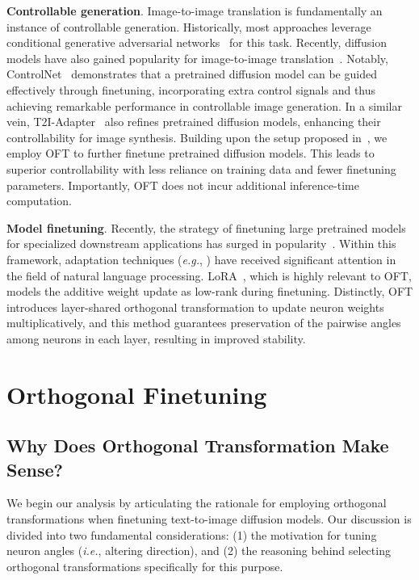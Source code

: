 \textbf{Controllable generation}. Image-to-image translation is fundamentally an instance of controllable generation. Historically, most approaches leverage conditional generative adversarial networks~\cite{isola2017image,zhu2017toward,wang2018high,park2019semantic,choi2018stargan} for this task. Recently, diffusion models have also gained popularity for image-to-image translation~\cite{saharia2022palette,voynov2022sketch,wang2022pretraining}. Notably, ControlNet~\cite{zhang2023adding} demonstrates that a pretrained diffusion model can be guided effectively through finetuning, incorporating extra control signals and thus achieving remarkable performance in controllable image generation. In a similar vein, T2I-Adapter~\cite{mou2023t2i} also refines pretrained diffusion models, enhancing their controllability for image synthesis. Building upon the setup proposed in~\cite{zhang2023adding,mou2023t2i}, we employ OFT to further finetune pretrained diffusion models. This leads to superior controllability with less reliance on training data and fewer finetuning parameters. Importantly, OFT does not incur additional inference-time computation.

\textbf{Model finetuning}. Recently, the strategy of finetuning large pretrained models for specialized downstream applications has surged in popularity~\cite{devlin2018bert,brown2020language,he2022masked}. Within this framework, adaptation techniques (\emph{e.g.}, \cite{hulora2022,houlsby2019parameter,pfeiffer2020adapterfusion}) have received significant attention in the field of natural language processing. LoRA~\cite{hulora2022}, which is highly relevant to OFT, models the additive weight update as low-rank during finetuning. Distinctly, OFT introduces layer-shared orthogonal transformation to update neuron weights multiplicatively, and this method guarantees preservation of the pairwise angles among neurons in each layer, resulting in improved stability.

\section{Orthogonal Finetuning}

\subsection{Why Does Orthogonal Transformation Make Sense?}

We begin our analysis by articulating the rationale for employing orthogonal transformations when finetuning text-to-image diffusion models. Our discussion is divided into two fundamental considerations: (1) the motivation for tuning neuron angles (\emph{i.e.}, altering direction), and (2) the reasoning behind selecting orthogonal transformations specifically for this purpose.

